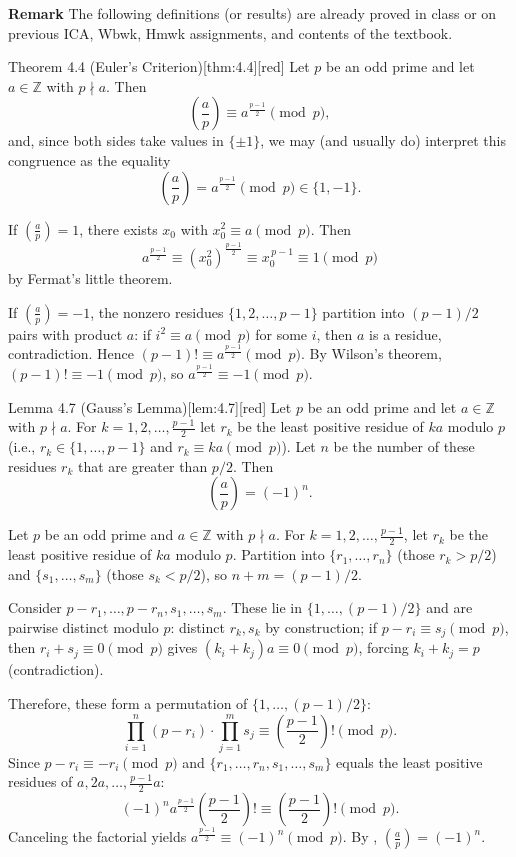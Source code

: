 \textbf{Remark} The following definitions (or results) are already proved in class or on previous ICA, Wbwk, Hmwk assignments, and contents of the textbook.
\begin{define}{Theorem 4.4 (Euler's Criterion)}[thm:4.4][red]
  Let $p$ be an odd prime and let $a\in\mathbb{Z}$ with $p\nmid a$. Then
  \[
  \left(\frac{a}{p}\right) \equiv a^{\frac{p-1}{2}} \pmod p,
  \]
  and, since both sides take values in $\{\pm1\}$, we may (and usually do) interpret this congruence as the equality
  \[
  \left(\frac{a}{p}\right) = a^{\frac{p-1}{2}} \pmod p \in\{1,-1\}.
  \]
  \begin{subprove}
    If $\left(\frac{a}{p}\right)=1$, there exists $x_0$ with $x_0^2\equiv a\pmod p$. Then
    \[
    a^{\frac{p-1}{2}} \equiv (x_0^2)^{\frac{p-1}{2}} \equiv x_0^{\,p-1}\equiv 1\pmod p
    \]
    by Fermat's little theorem.
    
    If $\left(\frac{a}{p}\right)=-1$, the nonzero residues $\{1,2,\dots,p-1\}$ partition into $(p-1)/2$ pairs with product $a$: if $i^2\equiv a\pmod p$ for some $i$, then $a$ is a residue, contradiction. Hence $(p-1)!\equiv a^{\frac{p-1}{2}} \pmod p$. By Wilson's theorem, $(p-1)!\equiv -1\pmod p$, so $a^{\frac{p-1}{2}}\equiv -1\pmod p$.
  \end{subprove}
\end{define}
\begin{define}{Lemma 4.7 (Gauss's Lemma)}[lem:4.7][red]
  Let $p$ be an odd prime and let $a\in\mathbb{Z}$ with $p\nmid a$. For $k=1,2,\dots,\frac{p-1}{2}$ let $r_k$ be the least positive residue of $ka$ modulo $p$ (i.e., $r_k\in\{1,\dots,p-1\}$ and $r_k\equiv ka\pmod p$). Let $n$ be the number of these residues $r_k$ that are greater than $p/2$. Then
  \[
  \left(\frac{a}{p}\right)=(-1)^n.
  \]
  \begin{subprove}
  Let $p$ be an odd prime and $a\in\mathbb{Z}$ with $p\nmid a$. For $k=1,2,\dots,\frac{p-1}{2}$, let $r_k$ be the least positive residue of $ka$ modulo $p$. Partition into $\{r_1,\dots,r_n\}$ (those $r_k>p/2$) and $\{s_1,\dots,s_m\}$ (those $s_k<p/2$), so $n+m=(p-1)/2$.

  Consider $p-r_1,\dots,p-r_n,s_1,\dots,s_m$. These lie in $\{1,\dots,(p-1)/2\}$ and are pairwise distinct modulo $p$: distinct $r_k,s_k$ by construction; if $p-r_i\equiv s_j\pmod p$, then $r_i+s_j\equiv 0\pmod p$ gives $(k_i+k_j)a\equiv 0\pmod p$, forcing $k_i+k_j=p$ (contradiction).

  Therefore, these form a permutation of $\{1,\dots,(p-1)/2\}$:
  \[
  \prod_{i=1}^n (p-r_i)\cdot\prod_{j=1}^m s_j \equiv \left(\frac{p-1}{2}\right)! \pmod p.
  \]
  Since $p-r_i \equiv -r_i\pmod p$ and $\{r_1,\dots,r_n,s_1,\dots,s_m\}$ equals the least positive residues of $a,2a,\dots,\frac{p-1}{2}a$:
  \[
  (-1)^n a^{\frac{p-1}{2}}\left(\frac{p-1}{2}\right)! \equiv \left(\frac{p-1}{2}\right)! \pmod p.
  \]
  Canceling the factorial yields $a^{\frac{p-1}{2}}\equiv (-1)^n\pmod p$. By , $\left(\frac{a}{p}\right)=(-1)^n$.
  \end{subprove}
\end{define}
